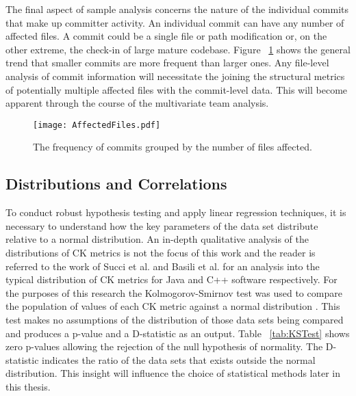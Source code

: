 The final aspect of sample analysis concerns the nature of the individual commits that make up committer activity. An individual commit can have any number of affected files. A commit could be a single file or path modification or, on the other extreme, the check-in of large mature codebase. Figure ~\ref{fig:AffectedFiles} shows the general trend that smaller commits are more frequent than larger ones. Any file-level analysis of commit information will necessitate the joining the structural metrics of potentially multiple affected files with the commit-level data. This will become apparent through the course of the multivariate team analysis.

\begin{figure}[htbp!] 
\centering    
\texttt{[image: AffectedFiles.pdf]}
\caption{The frequency of commits grouped by the number of files affected.}
\label{fig:AffectedFiles}
\end{figure}

\subsection{Distributions and Correlations}
To conduct robust hypothesis testing and apply linear regression techniques, it is necessary to understand how the key parameters of the data set distribute relative to a normal distribution. An in-depth qualitative analysis of the distributions of CK metrics is not the focus of this work and the reader is referred to the work of Succi et al. \citep{succi2005empirical} and Basili et al. \citep{basili1996validation} for an analysis into the typical distribution of CK metrics for Java and C++ software respectively. For the purposes of this research the Kolmogorov-Smirnov test was used to compare the population of values of each CK metric against a normal distribution \citep{kolmogorov1933sulla, smirnov1948table}. This test makes no assumptions of the distribution of those data sets being compared and produces a p-value and a D-statistic as an output. Table ~\ref{tab:KSTest} shows zero p-values allowing the rejection of the null hypothesis of normality. The D-statistic indicates the ratio of the data sets that exists outside the normal distribution. This insight will influence the choice of statistical methods later in this thesis.

